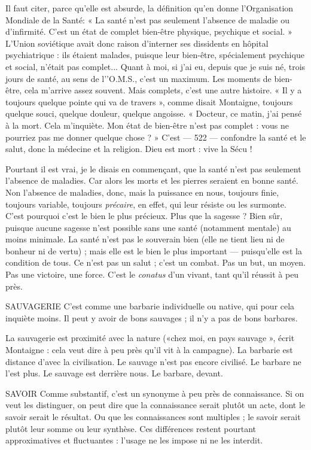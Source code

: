 Il faut citer, parce qu’elle est absurde, la définition qu’en donne l'Organisation
Mondiale de la Santé: « La santé n’est pas seulement l'absence de
maladie ou d’infirmité. C’est un état de complet bien-être physique, psychique
et social. » L'Union soviétique avait donc raison d’interner ses dissidents en
hôpital psychiatrique : ils étaient malades, puisque leur bien-être, spécialement
psychique et social, n’était pas complet... Quant à moi, si j'ai eu, depuis que je
suis né, trois jours de santé, au sens de l’'O.M.S., c’est un maximum. Les
moments de bien-être, cela m'arrive assez souvent. Mais complets, c’est une
autre histoire. « Il y a toujours quelque pointe qui va de travers », comme disait
Montaigne, toujours quelque souci, quelque douleur, quelque angoisse.
« Docteur, ce matin, j'ai pensé à la mort. Cela m'inquiète. Mon état de bien-être
n’est pas complet : vous ne pourriez pas me donner quelque chose ? » C’est
— 522 —
confondre la santé et le salut, donc la médecine et la religion. Dieu est mort :
vive la Sécu !

Pourtant il est vrai, je le disais en commençant, que la santé n’est pas seulement
l’absence de maladies. Car alors les morts et les pierres seraient en
bonne santé. Non l’absence de maladies, donc, mais la puissance en nous, toujours
finie, toujours variable, toujours {\it précaire}, en effet, qui leur résiste ou les
surmonte. C’est pourquoi c’est le bien le plus précieux. Plus que la sagesse ?
Bien sûr, puisque aucune sagesse n’est possible sans une santé (notamment
mentale) au moins minimale. La santé n’est pas le souverain bien (elle ne tient
lieu ni de bonheur ni de vertu) ; mais elle est le bien le plus important —
puisqu'elle est la condition de tous. Ce n’est pas un salut ; c’est un combat. Pas
un but, un moyen. Pas une victoire, une force. C’est le {\it conatus} d’un vivant, tant
qu’il réussit à peu près.

SAUVAGERIE C’est comme une barbarie individuelle ou native, qui pour
cela inquiète moins. Il peut y avoir de bons sauvages ; il n’y
a pas de bons barbares.

La sauvagerie est proximité avec la nature («chez moi, en pays sauvage »,
écrit Montaigne : cela veut dire à peu près qu’il vit à la campagne). La barbarie
est distance d’avec la civilisation. Le sauvage n’est pas encore civilisé. Le barbare
ne l’est plus. Le sauvage est derrière nous. Le barbare, devant.

SAVOIR Comme substantif, c’est un synonyme à peu près de connaissance.
Si on veut les distinguer, on peut dire que la connaissance serait
plutôt un acte, dont le savoir serait le résultat. Ou que les connaissances sont
multiples ; le savoir serait plutôt leur somme ou leur synthèse. Ces différences
restent pourtant approximatives et fluctuantes : l’usage ne les impose ni ne les
interdit.

